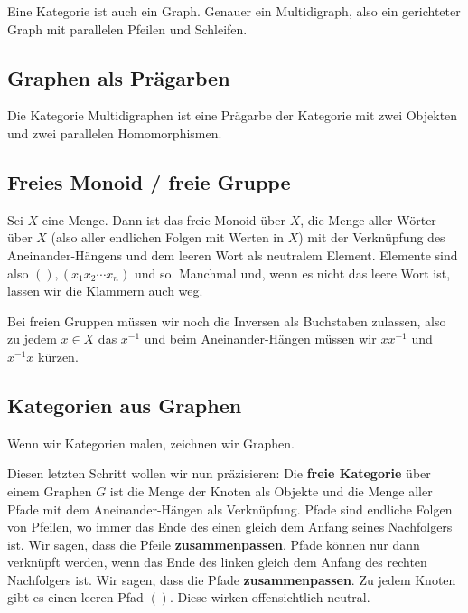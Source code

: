 \documentclass[a4paper]{amsart}
\theoremstyle{definition}
\begin{document}
Eine Kategorie ist auch ein Graph. Genauer ein Multidigraph, also ein gerichteter Graph mit parallelen Pfeilen und Schleifen.

\subsection{Graphen als Prägarben}
Die Kategorie Multidigraphen ist eine Prägarbe der Kategorie mit zwei Objekten und zwei parallelen Homomorphismen.

\subsection{Freies Monoid / freie Gruppe}
Sei $X$ eine Menge. Dann ist das freie Monoid über $X$, die Menge aller Wörter über $X$ (also aller endlichen Folgen mit Werten in $X$) mit der Verknüpfung des Aneinander-Hängens und dem leeren Wort als neutralem Element. Elemente sind also $(), (x_1x_2\cdots x_n)$ und so. Manchmal und, wenn es nicht das leere Wort ist, lassen wir die Klammern auch weg.

Bei freien Gruppen müssen wir noch die Inversen als Buchstaben zulassen, also zu jedem $x \in X$ das $x^{-1}$ und beim Aneinander-Hängen müssen wir $xx^{-1}$ und $x^{-1}x$ kürzen.  

\subsection{Kategorien aus Graphen}
Wenn wir Kategorien malen, zeichnen wir Graphen.

Diesen letzten Schritt wollen wir nun präzisieren: Die \textbf{freie Kategorie} über einem Graphen $G$ ist die Menge der Knoten als Objekte und die Menge aller Pfade mit dem Aneinander-Hängen als Verknüpfung. Pfade sind endliche Folgen von Pfeilen, wo immer das Ende des einen gleich dem Anfang seines Nachfolgers ist. Wir sagen, dass die Pfeile \textbf{zusammenpassen}. Pfade können nur dann verknüpft werden, wenn das Ende des linken gleich dem Anfang des rechten Nachfolgers ist. Wir sagen, dass die Pfade \textbf{zusammenpassen}. Zu jedem Knoten gibt es einen leeren Pfad $()$. Diese wirken offensichtlich neutral.
\end{document}
